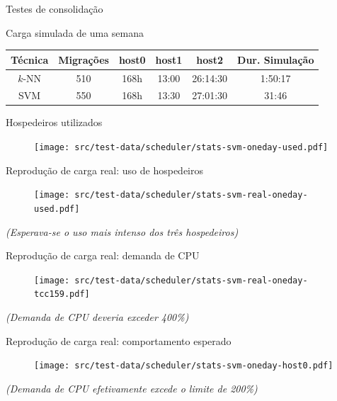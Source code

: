 \documentclass{beamer}
\begin{document}
\begin{frame}{Testes de consolidação}
\begin{block}{Carga simulada de uma semana}
\begin{table}
\begin{tabular}{| c | c | c | c | c | c |}
\hline
Técnica & Migrações & host0  & host1    & host2       & Dur. Simulação \\
\hline
$k$-NN 	& 510        & 168h  & 13:00    & 26:14:30    & 1:50:17  \\
\hline
SVM 	& 550        & 168h  & 13:30 	& 27:01:30    & 31:46  \\
\hline
\end{tabular}
\end{table}
\end{block}
\end{frame}

\begin{frame}{Hospedeiros utilizados}
\begin{figure}
\centering
\texttt{[image: src/test-data/scheduler/stats-svm-oneday-used.pdf]}
\end{figure}
\end{frame}

\begin{frame}{Reprodução de carga real: uso de hospedeiros}
\begin{figure}
\centering
\texttt{[image: src/test-data/scheduler/stats-svm-real-oneday-used.pdf]}
\end{figure}
\tiny{\emph{(Esperava-se o uso mais intenso dos três hospedeiros)}}
\end{frame}

\begin{frame}{Reprodução de carga real: demanda de CPU}
\begin{figure}
\centering
\texttt{[image: src/test-data/scheduler/stats-svm-real-oneday-tcc159.pdf]}
\end{figure}
\tiny{\emph{(Demanda de CPU deveria exceder 400\%)}}
\end{frame}

\begin{frame}{Reprodução de carga real: comportamento esperado}
\begin{figure}
\centering
\texttt{[image: src/test-data/scheduler/stats-svm-oneday-host0.pdf]}
\end{figure}
\tiny{\emph{(Demanda de CPU efetivamente excede o limite de 200\%)}}
\end{frame}
\end{document}
